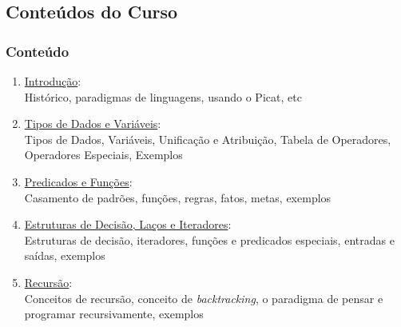 \subsection{Conteúdos do Curso}
			
\begin{frame}[fragile]
  \frametitle{Conteúdo}
  \begin{enumerate}

					
    \item  \underline{Introdução}:\\
    Histórico, paradigmas de linguagens, usando o Picat, etc

    \pause
    \item \underline{Tipos de Dados e Variáveis}:\\
Tipos de Dados, Variáveis, Unificação e Atribuição, Tabela de Operadores, Operadores Especiais,
 Exemplos
    
    \pause
		\item \underline{Predicados e Funções}:\\
Casamento de padrões, funções, regras, fatos, metas, exemplos
		
    \pause
    \item \underline{Estruturas de Decisão, Laços e Iteradores}:\\
Estruturas de decisão, iteradores, funções e predicados especiais, 
entradas e saídas, exemplos
    
    \pause
		\item  \underline{Recursão}:\\
     Conceitos de recursão, conceito de \textit{backtracking}, o paradigma
     de pensar e programar recursivamente, exemplos
\end{enumerate}

\end{frame}




